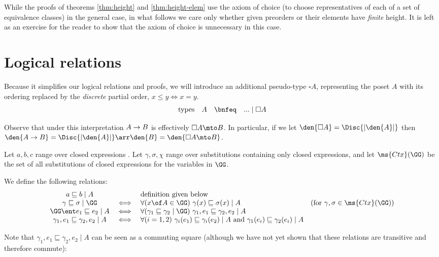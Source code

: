 \documentclass{article}
\renewcommand{\land}{~\text{and}~}
\newcommand{\ale}{\sqsubseteq}
\newcommand{\disc}[1]{\square{#1}}
\newcommand{\lr}[2]{#2\mathrel{|}#1}
\newcommand{\lrcx}[3]{#1 \ent \lr{#2}{#3}}
\newcommand{\commsq}[5]{\lr{#1}{{#2}, {#4} \ale {#3}, {#5}}}
\begin{document}
While the proofs of theorems \ref{thm:height} and \ref{thm:height-elem} use the
axiom of choice (to choose representatives of each of a set of equivalence
classes) in the general case, in what follows we care only whether given
preorders or their elements have \emph{finite} height. It is left as an exercise
for the reader to show that the axiom of choice is unnecessary in this case.


\section{Logical relations}

Because it simplifies our logical relations and proofs, we will introduce an
additional pseudo-type $\disc{A}$, representing the poset $A$ with its ordering
replaced by the \emph{discrete} partial order, $x \le y \iff x = y$.
\[\begin{array}{rccl}
  \text{types} &
  A &\bnfeq& ... \pipe \disc{A}
\end{array}\]

Observe that under this interpretation $A \to B$ is effectively $\disc{A} \mto
B$. In particular, if we let $\den{\disc{A}} = \Disc{|\den{A}|}$ then $\den{A
  \uto B} = \Disc{|\den{A}|} \arr \den{B} = \den{\disc{A} \mto B}$.

Let $a,b,c$ range over closed expressions%
. Let $\gamma, \sigma, \chi$ range over substitutions containing only closed
expressions, and let $\ms{Ctx}(\GG)$ be the set of all substitutions of closed
expressions for the variables in $\GG$.

We define the following relations:
\[\begin{array}{ccll}
    \lr{A}{a \ale b}  && \text{definition given below}\\
    \lr{\GG}{\gamma \ale \sigma}
    &\iff& \forall(x \of A \in \GG)\ \lr{A}{\gamma(x) \ale \sigma(x)}
    & (\text{for}~\gamma,\sigma \in \ms{Ctx}(\GG))\\
    \lrcx{\GG}{A}{e_1 \ale e_2}
    &\iff& \forall(\lr{\GG}{\gamma_1 \ale \gamma_2})\
    \commsq{A}{\gamma_1}{\gamma_2}{e_1}{e_2}\\
    \commsq{A}{\gamma_1}{\gamma_2}{e_1}{e_2}
    &\iff& \forall(i = 1,2)\ \lr{A}{\gamma_i(e_1) \ale \gamma_i(e_2)}
    \land \lr{A}{\gamma_1(e_i) \ale \gamma_2(e_i)}
\end{array}\]

Note that $\commsq{A}{\gamma_1}{\gamma_2}{e_1}{e_2}$ can be seen as a commuting
square (although we have not yet shown that these relations are transitive and
therefore commute):
\begin{center}
  {\large
  }
\end{center}
\end{document}
